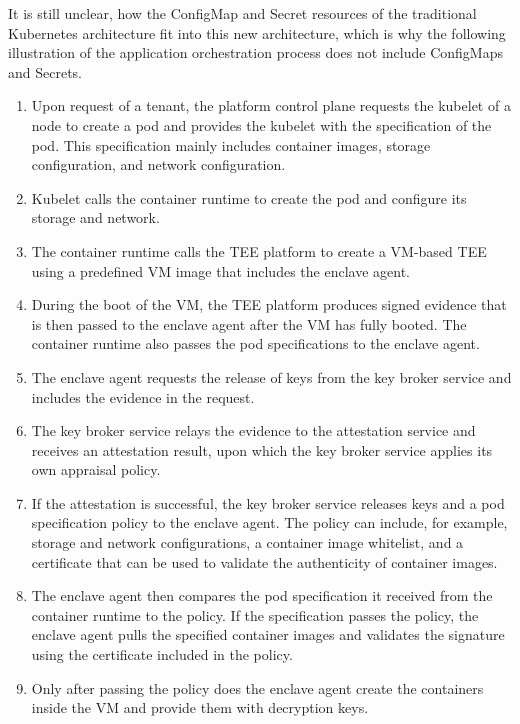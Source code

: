 It is still unclear, how the ConfigMap and Secret resources of the traditional
Kubernetes architecture fit into this new architecture, which is why the
following illustration of the application orchestration process does not include
ConfigMaps and Secrets.

\begin{enumerate}
  \item Upon request of a tenant, the platform control plane requests the
        kubelet of a node to create a pod and provides the kubelet with the
        specification of the pod. This specification mainly includes container
        images, storage configuration, and network configuration.
  \item Kubelet calls the container runtime to create the pod and configure its
        storage and network.
  \item The container runtime calls the TEE platform to create a VM-based TEE
        using a predefined VM image that includes the enclave agent.
  \item During the boot of the VM, the TEE platform produces signed evidence that
        is then passed to the enclave agent after the VM has fully booted. The
        container runtime also passes the pod specifications to the enclave
        agent.
  \item The enclave agent requests the release of keys from the key broker
        service and includes the evidence in the request.
  \item The key broker service relays the evidence to the attestation service
        and receives an attestation result, upon which the key broker service
        applies its own appraisal policy.
  \item If the attestation is successful, the key broker service releases keys
        and a pod specification policy to the enclave agent. The policy can
        include, for example, storage and network configurations, a container
        image whitelist, and a certificate that can be used to validate the
        authenticity of container images.
  \item The enclave agent then compares the pod specification it received from
        the container runtime to the policy. If the specification passes the
        policy, the enclave agent pulls the specified container images and
        validates the signature using the certificate included in the policy.
  \item Only after passing the policy does the enclave agent create the
  containers inside the VM and provide them with decryption keys.
\end{enumerate}

